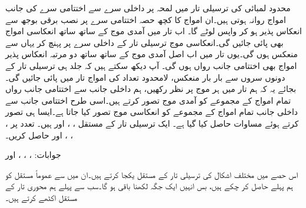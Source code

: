 محدود لمبائی کی ترسیلی تار میں لمحہ  پر داخلی سرے سے اختتامی سرے کی جانب  امواج روانہ ہوتی ہیں۔ان امواج کا کچھ حصہ اختتامی سرے پر نصب برقی بوجھ سے انعکاس پذیر ہو کر واپس لوٹے گا۔ اب تار میں آمدی موج کے ساتھ ساتھ انعکاسی امواج بھی پائی جائیں گی۔انعکاسی موج ترسیلی تار کے داخلی سرے پر پہنچ کر یہاں سے منعکس ہوں گی۔یوں تار میں اب اصل آمدی موج کے ساتھ ساتھ دو مرتبہ انعکاس پذیر امواج بھی اختتامی جانب رواں ہوں گی۔ آپ دیکھ سکتے ہیں کہ جلد ہی ترسیلی تار کے دونوں سروں سے بار بار منعکس، لامحدود تعداد کی امواج تار میں پائی جائیں گی۔بجائے یہ کہ ہم تار میں ہر موج پر نظر رکھیں، ہم داخلی جانب سے اختتامی جانب رواں تمام امواج کے مجموعے کو آمدی موج تصور کرتے ہیں۔اسی طرح اختتامی جانب سے داخلی جانب تمام امواج کے مجموعے کو انعکاسی موج تصور کیا جاتا ہے۔ایسا ہی تصور کرتے ہوئے  مساوات  حاصل کیا گیا ہے۔  
ایک ترسیلی تار  کے مستقل ، ،  اور  ہیں۔ تعدد  پر ، ، ،  اور  حاصل کریں۔

جوابات: ، ، ،  اور  

اس حصے میں مختلف اشکال کی ترسیلی تار کے مستقل یکجا کرتے ہیں۔ان میں سے عموماً مستقل کو ہم پہلے حاصل کر چکے ہیں، بس انہیں ایک جگہ لکھنا باقی ہو گا۔سب سے پہلے ہم محوری تار کے مستقل اکٹھے کرتے ہیں۔

